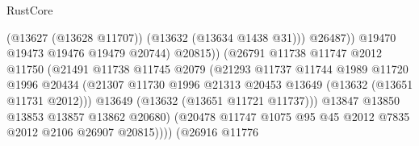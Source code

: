 \begin{lexlean}{RustCore}
\begin{coremodule}
                                                (@13627 (@13628 @11707))
                                                (@13632 (@13634 @1438 @31)))
                                              @26487))
                                          @19470
                                          @19473
                                          @19476
                                          @19479
                                          @20744)
                                        @20815))
                                    (@26791
                                      @11738
                                      @11747
                                      @2012
                                      @11750
                                      (@21491
                                        @11738
                                        @11745
                                        @2079
                                        (@21293
                                          @11737
                                          @11744
                                          @1989
                                          @11720
                                          @1996
                                          @20434
                                          (@21307
                                            @11730
                                            @1996
                                            @21313
                                            @20453
                                            @13649
                                            (@13632 (@13651 @11731 @2012)))
                                          @13649
                                          (@13632 (@13651 @11721 @11737)))
                                        @13847
                                        @13850
                                        @13853
                                        @13857
                                        @13862
                                        @20680)
                                      (@20478
                                        @11747
                                        @1075
                                        @95
                                        @45
                                        @2012
                                        @7835
                                        @2012
                                        @2106
                                        @26907
                                        @20815))))
                                (@26916
                                  @11776

\end{coremodule}
\end{lexlean}
